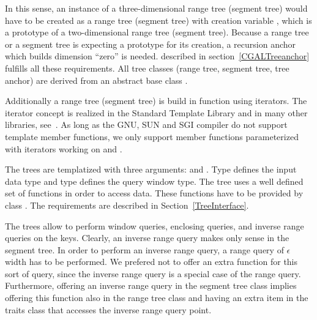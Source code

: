 In this sense, an instance of a
three-dimensional range tree (segment tree) would have to be
created as a range tree (segment tree) with creation variable
 , which is a prototype of a two-dimensional
range tree (segment tree). Because a range tree or a segment tree
is expecting a prototype for its creation, a recursion anchor which
builds dimension ``zero'' is needed.
 described in
section~\ref{CGALTreeanchor} fulfills all these requirements.
All tree classes (range tree, segment tree, tree anchor) are
derived from an abstract base class
.

Additionally a range tree (segment tree) is build in function
 using  iterators.
The iterator concept is realized in the Standard
Template Library and in many other libraries,
see~\cite{cgal:ms-strg-96}. As long as the GNU, SUN and SGI compiler do not
support template member functions, we only support member
functions parameterized with iterators working on  and .

The trees are templatized with three arguments:  and . Type  defines
the input data type and type  defines the query
window type.
The tree uses a well defined set of functions in
order to access data. These functions have to be provided by
class . The requirements are described in
Section~\ref{TreeInterface}.

The trees allow to perform
window queries, enclosing queries, and inverse range queries on
the keys. Clearly, an inverse range query makes only sense in the
segment tree.
In order to perform an inverse range query, a range query of
$\epsilon$ width has to be performed. We prefered not to offer an
extra function for this sort of query, since the inverse range
query is a special case of the range query. Furthermore, offering
an inverse range query in the segment tree class implies offering this
function also in the range tree class and having an extra item in
the traits class that accesses the inverse range query point.


